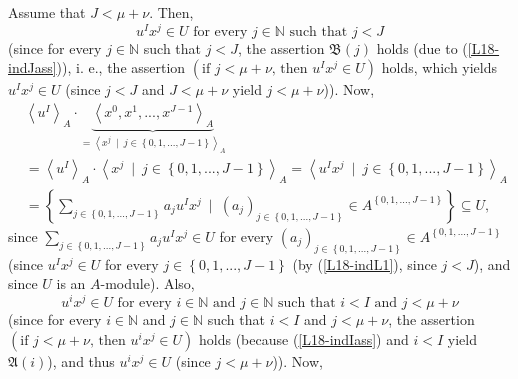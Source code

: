 \documentclass[12pt,final,notitlepage,onecolumn]{article}%
\begin{document}
Assume that $J<\mu+\nu$. Then,%
\begin{equation}
u^{I}x^{j}\in U\text{ for every }j\in\mathbb{N}\text{ such that }j<J
\label{L18-indL1}%
\end{equation}
(since for every $j\in\mathbb{N}$ such that $j<J$, the assertion
$\mathfrak{B}\left(  j\right)  $ holds (due to (\ref{L18-indJass})), i. e.,
the assertion $\left(  \text{if }j<\mu+\nu\text{, then }u^{I}x^{j}\in
U\right)  $ holds, which yields $u^{I}x^{j}\in U$ (since $j<J$ and $J<\mu+\nu$
yield $j<\mu+\nu$)). Now,%
\begin{align}
&  \left\langle u^{I}\right\rangle _{A}\cdot\underbrace{\left\langle
x^{0},x^{1},...,x^{J-1}\right\rangle _{A}}_{=\left\langle x^{j}\ \mid
\ j\in\left\{  0,1,...,J-1\right\}  \right\rangle _{A}}\nonumber\\
&  =\left\langle u^{I}\right\rangle _{A}\cdot\left\langle x^{j}\ \mid
\ j\in\left\{  0,1,...,J-1\right\}  \right\rangle _{A}=\left\langle u^{I}%
x^{j}\ \mid\ j\in\left\{  0,1,...,J-1\right\}  \right\rangle _{A}\nonumber\\
&  =\left\{  \sum\limits_{j\in\left\{  0,1,...,J-1\right\}  }a_{j}u^{I}%
x^{j}\ \mid\ \left(  a_{j}\right)  _{j\in\left\{  0,1,...,J-1\right\}  }\in
A^{\left\{  0,1,...,J-1\right\}  }\right\}  \subseteq U,
\label{L18-indL1final}%
\end{align}
since $\sum\limits_{j\in\left\{  0,1,...,J-1\right\}  }a_{j}u^{I}x^{j}\in U$
for every $\left(  a_{j}\right)  _{j\in\left\{  0,1,...,J-1\right\}  }\in
A^{\left\{  0,1,...,J-1\right\}  }$ (since $u^{I}x^{j}\in U$ for every
$j\in\left\{  0,1,...,J-1\right\}  $ (by (\ref{L18-indL1}), since $j<J$), and
since $U$ is an $A$-module). Also,%
\begin{equation}
u^{i}x^{j}\in U\text{ for every }i\in\mathbb{N}\text{ and }j\in\mathbb{N}%
\text{ such that }i<I\text{ and }j<\mu+\nu\label{L18-indL2}%
\end{equation}
(since for every $i\in\mathbb{N}$ and $j\in\mathbb{N}$ such that $i<I$ and
$j<\mu+\nu$, the assertion $\left(  \text{if }j<\mu+\nu\text{, then }%
u^{i}x^{j}\in U\right)  $ holds (because (\ref{L18-indIass}) and $i<I$ yield
$\mathfrak{A}\left(  i\right)  $), and thus $u^{i}x^{j}\in U$ (since
$j<\mu+\nu$)). Now,%
\end{document}
